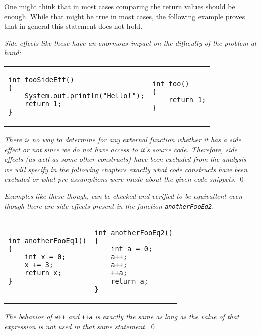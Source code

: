 One might think that in most cases comparing the return values should be enough. While that might be true in most cases, the following example proves that in general this statement does not hold.

\begin{exmp}
\textit{Side effects like these have an enormous impact on the difficulty of the problem at hand:}

\begin{tabular}{ p{4.5cm} p{4.5cm} }
\begin{lstlisting}
int fooSideEff()
{
    System.out.println("Hello!");
    return 1;
}
\end{lstlisting}
&
\begin{lstlisting}
int foo()
{
    return 1;
}
\end{lstlisting}
\end{tabular}

\textit{There is no way to determine for any external function whether it has a side effect or not since we do not have access to it's source code. Therefore, side effects (as well as some other constructs) have been excluded from the analysis - we will specify in the following chapters exactly what code constructs have been excluded or what pre-assumptions were made about the given code snippets.}
\qed
\end{exmp}

\begin{exmp}
\textit{Examples like these though, can be checked and verified to be equivallent even though there are side effects present in the function \texttt{anotherFooEq2}.}

\begin{tabular}{ p{4.5cm} p{4.5cm} }
\begin{lstlisting}
int anotherFooEq1()
{
    int x = 0;
    x += 3;
    return x;
}
\end{lstlisting}
&
\begin{lstlisting}
int anotherFooEq2()
{
    int a = 0;
    a++;
    a++;
    ++a;
    return a;
}
\end{lstlisting}
\end{tabular}

\textit{The behavior of \texttt{a++} and \texttt{++a} is exactly the same as long as the value of that expression is not used in that same statement.}
\qed
\end{exmp}

